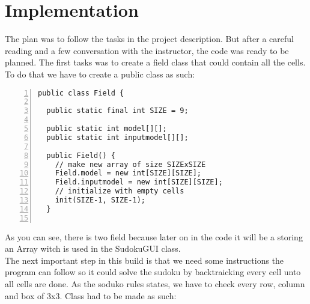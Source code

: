 \documentclass{article}
\begin{document}
\section{Implementation}\label{sec:ass3}
The plan was to follow the tasks in the project description. But after a careful reading and a few conversation with the instructor, the code was ready to be planned. The first tasks was to create a field class that could contain all the cells.\\   
To do that we have to create a public class as such:

\begin{lstlisting}[language=Tex, basicstyle=\footnotesize\ttfamily,
numbers=left,stepnumber=1,frame=lrtb, morekeywords={assert}, tabsize=4,
breaklines=false]
public class Field {

  public static final int SIZE = 9;

  public static int model[][];
  public static int inputmodel[][];

  public Field() {
    // make new array of size SIZExSIZE
    Field.model = new int[SIZE][SIZE];
    Field.inputmodel = new int[SIZE][SIZE];
    // initialize with empty cells
    init(SIZE-1, SIZE-1);
  }


\end{lstlisting}

As you can see, there is two field because later on in the code it will be a storing an Array witch is used in the SudokuGUI class.\\

The next important step in this build is that we need some instructions the program can follow so it could solve the sudoku by backtraicking every cell unto all cells are done.
As the soduko rules states, we have to check every row, column and box of 3x3. 
Class had to be made as such:
\end{document}
